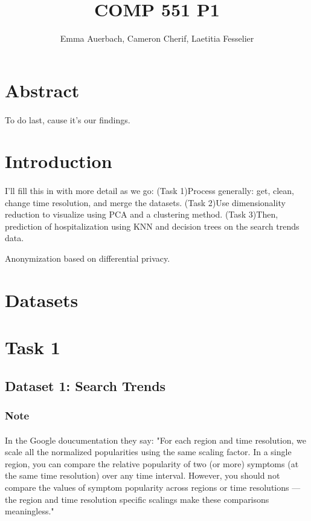 \documentclass{article}
\title{COMP 551 P1}
\author{Emma Auerbach, Cameron Cherif, Laetitia Fesselier }
\begin{document}
\maketitle

\section*{Abstract}
\paragraph{}
To do last, cause it's our findings. 
\section*{Introduction}
\paragraph{}
I'll fill this in with more detail as we go: (Task 1)Process generally: get, clean, change time resolution, and merge the datasets. (Task 2)Use dimensionality reduction to visualize using PCA and a clustering method. (Task 3)Then, prediction of hospitalization using KNN and decision trees on the search trends data.

Anonymization based on differential privacy. \cite{Bavadekar et al}
\section*{Datasets}

\section*{Task 1}

\subsection*{Dataset 1: Search Trends}
\subsubsection*{Note}
\paragraph{}
In the Google doucumentation they say: "For each region and time resolution, we scale all the normalized popularities using the same scaling factor. In a single region, you can compare the relative popularity of two (or more) symptoms (at the same time resolution) over any time interval. However, you should not compare the values of symptom popularity across regions or time resolutions — the region and time resolution specific scalings make these comparisons meaningless."
\end{document}

